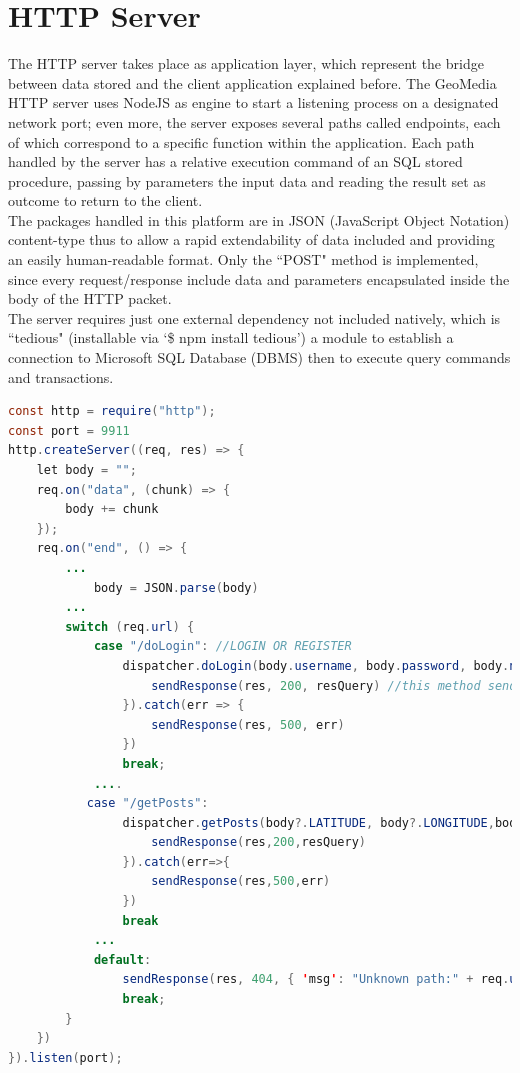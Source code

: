 \documentclass[conference]{IEEEtran}
\begin{document}
\section{HTTP Server}

The HTTP server takes place as application layer, which represent the bridge between data stored and the client application explained before.
The GeoMedia HTTP server uses NodeJS\cite{b4} as engine to start a listening process on a designated network port; even more, the server exposes several paths called endpoints, each of which correspond to a specific function within the application. 
Each path handled by the server has a relative execution command of an SQL stored procedure, passing by parameters the input data and reading the result set as outcome to return to the client.
\\
The packages handled in this platform are in JSON (JavaScript Object Notation) content-type thus to allow a rapid extendability of data included and providing an easily human-readable format.
Only the ``POST" method is implemented, since every request/response include data and parameters encapsulated inside the body of the HTTP packet.
\\
The server requires just one external dependency not included natively, which is ``tedious"\cite{b5} (installable via `\$ npm install tedious') a module to establish a connection to Microsoft SQL Database (DBMS) then to execute query commands and transactions.

\begin{lstlisting}[language=Java, caption=Snippet of GeoMedia HTTP server]
const http = require("http");
const port = 9911
http.createServer((req, res) => {
    let body = "";
    req.on("data", (chunk) => {
        body += chunk
    });
    req.on("end", () => {
        ...
            body = JSON.parse(body)
        ...
        switch (req.url) {
            case "/doLogin": //LOGIN OR REGISTER
                dispatcher.doLogin(body.username, body.password, body.newuser).then(resQuery => {
                    sendResponse(res, 200, resQuery) //this method sends back the data
                }).catch(err => {
                    sendResponse(res, 500, err)
                })
                break;
            ....
           case "/getPosts":
                dispatcher.getPosts(body?.LATITUDE, body?.LONGITUDE,body?.USERNAME).then(resQuery=>{
                    sendResponse(res,200,resQuery)
                }).catch(err=>{
                    sendResponse(res,500,err)
                })
                break
            ...
            default:
                sendResponse(res, 404, { 'msg': "Unknown path:" + req.url })
                break;
        }
    })
}).listen(port);
\end{lstlisting}
\end{document}
